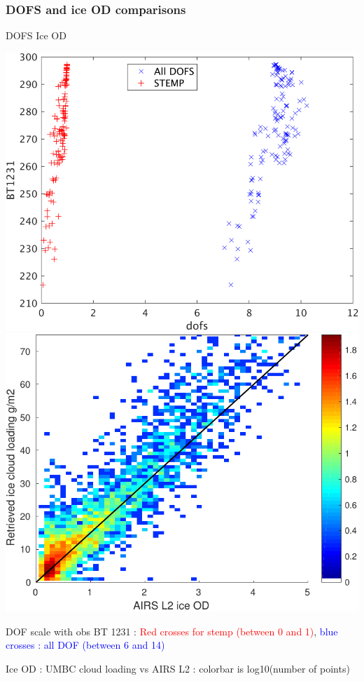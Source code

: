 \documentclass[10pt,t]{beamer}
\begin{document}
\begin{frame}
  \frametitle{DOFS and ice OD comparisons}

  \hspace{0.50in} DOFS \hspace{1.75in} Ice OD  \\
  \begin{center}
    \includegraphics[width=0.45\linewidth]{Figs/FigsRetr/AIRS_STM_Apr17/dofs_all_stemp_2011_03_11.png}
    \includegraphics[width=0.45\linewidth]{Figs/FigsRetr/AIRS_STM_Apr17/cloud1_OD_G039_new_may23_2016.pdf}
  \end{center}

  DOF scale with obs BT 1231 : \textcolor{red}{Red crosses for stemp
    (between 0 and 1)}, \textcolor{blue}{blue crosses : all DOF (between 6
    and 14)}

  Ice OD : UMBC cloud loading vs AIRS L2 : colorbar is log10(number of
  points)

\end{frame}
\end{document}
